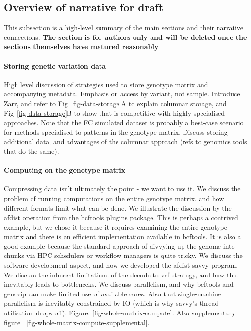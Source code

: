 \documentclass[a4paper,num-refs]{oup-contemporary}
\begin{document}
\subsection{Overview of narrative for draft}
This subsection is a high-level summary of the main sections and
their narrative connections. \textbf{The section is for authors only and
will be deleted
once the sections themselves have matured reasonably}

\paragraph{Storing genetic variation data}
High level discussion of
strategies used to store genotype matrix and accompanying metadata.
Emphasis on access by variant, not sample. Introduce Zarr, and
refer to Fig~\ref{fig-data-storage}A to explain columnar storage,
and Fig~\ref{fig-data-storage}B to show that is competitive
with highly specialised approaches.
Note that the FC simulated dataset is probably a best-case
scenario for methods specialised to patterns in the genotype matrix.
Discuss storing additional data, and advantages of the
columnar approach (refs to genomics tools that do the same).

\paragraph{Computing on the genotype matrix}
Compressing data isn't ultimately the point - we want to use it.
We discuss the problem of running computations on the entire
genotype matrix, and how different formats limit what can be done.
We illustrate the discussion by the afdist operation from
the bcftools plugins package. This is perhaps a contrived example, but
we chose it because it requires examining the entire genotype matrix
and there is an efficient implementation available in bcftools.
It is also a good example because the standard approach of
divvying up the genome into chunks via HPC schedulers or workflow
managers is quite tricky.
We discuss the software development aspect, and how we developed
the afdist-savvy program. We discuss the inherent limitations
of the decode-to-vcf strategy, and how this inevitably
leads to bottlenecks. We discuss parallelism, and why
bcftools and genozip can make limited use of available cores.
Also that single-machine parallelism is inevitably constrained
by IO (which is why savvy's thread utilisation drops off).
Figure: \ref{fig-whole-matrix-compute}. Also
supplementary figure ~\ref{fig-whole-matrix-compute-supplemental}.
\end{document}

